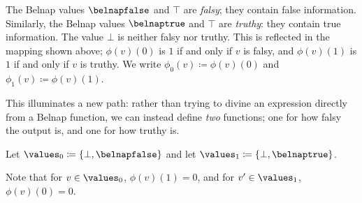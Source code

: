 The Belnap values \(\belnapfalse\) and \(\top\) are \emph{falsy}; they contain
false information.
Similarly, the Belnap values \(\belnaptrue\) and \(\top\) are \emph{truthy}:
they contain true information.
The value \(\bot\) is neither falsy nor truthy.
This is reflected in the mapping shown above; \(\phi(v)(0)\) is \(1\) if and
only if \(v\) is falsy, and \(\phi(v)(1)\) is \(1\) if and only if \(v\) is
truthy.
We write \(\phi_0(v) \coloneqq \phi(v)(0)\) and \(\phi_1(v) \coloneqq \phi(v)(1)\).

This illuminates a new path: rather than trying to divine an expression directly
from a Belnap function, we can instead define \emph{two} functions; one for how
falsy the output is, and one for how truthy is.

\begin{definition}
    Let \(\values_0 \coloneqq \{\bot, \belnapfalse\}\) and let
    \(\values_1 \coloneqq \{\bot, \belnaptrue\}\).
\end{definition}

Note that for \(v \in \values_0\), \(\phi(v)(1) = 0\), and for
\(v^\prime \in \values_1\), \(\phi(v)(0) = 0\).

